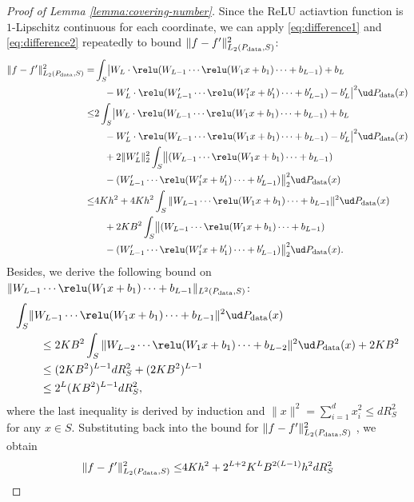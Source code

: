 \begin{proof}[Proof of Lemma \ref{lemma:covering-number}]
Since the ReLU actiavtion function is $1$-Lipschitz continuous for each coordinate, we can apply \eqref{eq:difference1} and \eqref{eq:difference2} repeatedly to bound $ \|f-f'\|^2_{L_2(P_{\rm data},S)}$:
\begin{align*}
  \norm{f-f'}^2_{L_2(P_{\rm data},S)}
  =& \int_{S}  \bigl|  W_L \cdot \relu (W_{L-1}\cdots \relu(W_1 x +b_1) \cdots +b_{L-1}) +b_L \\
  &\quad -  W_L' \cdot \relu (W_{L-1}'\cdots \relu(W_1' x +b_1') \cdots +b_{L-1}') -b_L'    \bigr|^2 \ud P_{\rm data}(x) \\
  \leq& 2 \int_{S}   \bigl|  W_L \cdot \relu (W_{L-1}\cdots \relu(W_1 x +b_1) \cdots +b_{L-1}) +b_L \\
  &\quad -  W_L' \cdot \relu (W_{L-1}\cdots \relu(W_1 x +b_1) \cdots +b_{L-1}) -b_L'  \bigr|^2 \ud P_{\rm data}(x)\\
  &\quad + 2 \norm{W_L'}_2^2 \int_{S}   \bigl\|   (W_{L-1}\cdots \relu(W_1 x +b_1) \cdots +b_{L-1})  \\
  &\quad -   (W_{L-1}' \cdots \relu(W_1' x +b_1') \cdots +b_{L-1}')  \bigr\|_2^2 \ud P_{\rm data}(x)\\
  \leq & 4 K h^2+ 4 K h^2  \int_{S}   \norm{  W_{L-1}\cdots \relu(W_1 x +b_1) \cdots +b_{L-1} }^2 \ud P_{\rm data}(x)\\ 
  &\quad +  2 K B^2 \int_{S}   \bigl\|   (W_{L-1}\cdots \relu(W_1 x +b_1) \cdots +b_{L-1})  \\
  &\quad -   (W_{L-1}' \cdots \relu(W_1' x +b_1') \cdots +b_{L-1}')  \bigr\|_2^2 \ud P_{\rm data}(x).
\end{align*}
Besides, we derive the following bound on $\norm{ W_{L-1}\cdots \relu(W_1 x +b_1) \cdots +b_{L-1}}_{L^2(P_{\rm data},S)}$:
\begin{align*}
    \int_{S}   &\norm{  W_{L-1}\cdots \relu(W_1 x +b_1) \cdots +b_{L-1} }^2 \ud P_{\rm data}(x) \\
    &\quad \leq  2KB^2 \int_{S}   \norm{  W_{L-2}\cdots \relu(W_1 x +b_1) \cdots +b_{L-2} }^2 \ud P_{\rm data}(x) +2KB^2 \\
    &\quad \leq (2KB^2)^{L-1} d R_S^2 +  (2KB^2)^{L-1} \\
    &\quad \leq 2^L(KB^2)^{L-1} d R_S^2,
\end{align*}
where the last inequality is derived by induction and $\|x \|^2 =\sum_{i=1}^d  x_i^2 \leq d R_S^2$ for any $x\in S$. Substituting back into the bound for $ \|f-f'\|^2_{L_2(P_{\rm data},S)}$ , we obtain
\begin{align*}
    \norm{f-f'}^2_{L_2(P_{\rm data},S)} \leq& 4 K h^2+ 2^{L+2} K^L B^{2(L-1)} h^2 d R_S^2 \\

\end{align*}
\end{proof}
